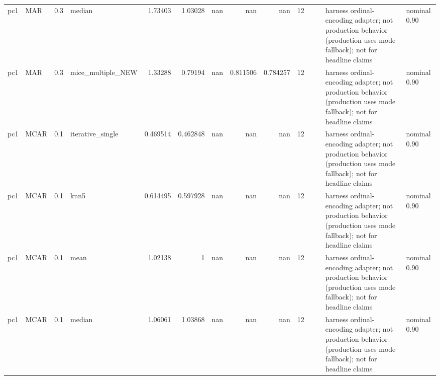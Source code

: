 \begin{table}[ht]
\begin{tabular}{llrlrrrrrrllll}
 pc1                  & MAR         &         0.3 & median            &       1.73403  &             1.03028  &               nan        &                     nan        &                       nan        &        12 &                    &                                         & harness ordinal-encoding adapter; not production behavior (production uses mode fallback); not for headline claims & nominal 0.90              \\
 pc1                  & MAR         &         0.3 & mice\_multiple\_NEW &       1.33288  &             0.79194  &               nan        &                       0.811506 &                         0.784257 &        12 &                    &                                         & harness ordinal-encoding adapter; not production behavior (production uses mode fallback); not for headline claims & nominal 0.90              \\
 pc1                  & MCAR        &         0.1 & iterative\_single  &       0.469514 &             0.462848 &               nan        &                     nan        &                       nan        &        12 &                    &                                         & harness ordinal-encoding adapter; not production behavior (production uses mode fallback); not for headline claims & nominal 0.90              \\
 pc1                  & MCAR        &         0.1 & knn5              &       0.614495 &             0.597928 &               nan        &                     nan        &                       nan        &        12 &                    &                                         & harness ordinal-encoding adapter; not production behavior (production uses mode fallback); not for headline claims & nominal 0.90              \\
 pc1                  & MCAR        &         0.1 & mean              &       1.02138  &             1        &               nan        &                     nan        &                       nan        &        12 &                    &                                         & harness ordinal-encoding adapter; not production behavior (production uses mode fallback); not for headline claims & nominal 0.90              \\
 pc1                  & MCAR        &         0.1 & median            &       1.06061  &             1.03868  &               nan        &                     nan        &                       nan        &        12 &                    &                                         & harness ordinal-encoding adapter; not production behavior (production uses mode fallback); not for headline claims & nominal 0.90              \\

\end{tabular}
\end{table}
